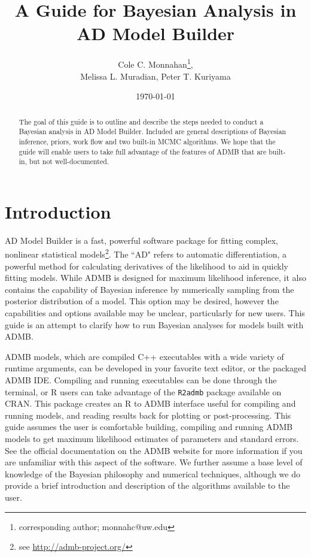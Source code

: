 \documentclass{article}\usepackage[]{graphicx}\usepackage[]{color}
\begin{document}
\title{A Guide for Bayesian Analysis in \\AD Model Builder} \author{Cole
  C. Monnahan\footnote{corresponding author; monnahc@uw.edu},\\ Melissa
  L. Muradian, Peter T. Kuriyama }
\date{\today{}}
\maketitle
\begin{abstract}
  The goal of this guide is to outline and describe the steps needed to
  conduct a Bayesian analysis in AD Model Builder. Included are general
  descriptions of Bayesian inference, priors, work flow and two built-in
  MCMC algorithms. We hope that the guide will enable users to take full
  advantage of the features of ADMB that are built-in, but not
  well-documented.

\end{abstract}

\tableofcontents

\section{Introduction}
AD Model Builder is a fast, powerful software package for fitting
complex, nonlinear statistical
models\cite{fournier2012}\footnote{see
  \url{http://admb-project.org/}}.  The ``AD" refers to
automatic differentiation, a powerful method for calculating
derivatives of the likelihood to aid in quickly fitting
models. While ADMB is designed for maximum likelihood
inference, it also contains the capability of Bayesian
inference by numerically sampling from the posterior
distribution of a model. This option may be desired, however
the capabilities and options available may be unclear,
particularly for new users. This guide is an attempt to
clarify how to run Bayesian analyses for models built with
ADMB.

ADMB models, which are compiled C++ executables with a wide
variety of runtime arguments, can be developed in your
favorite text editor, or the packaged ADMB IDE. Compiling
and running executables can be done through the terminal, or
R users can take advantage of the \texttt{R2admb} package
available on CRAN. This package creates an R to ADMB
interface useful for compiling and running models, and
reading results back for plotting or post-processing. This
guide assumes the user is comfortable building, compiling
and running ADMB models to get maximum likelihood estimates
of parameters and standard errors. See the official
documentation on the ADMB website for more information if
you are unfamiliar with this aspect of the software. We
further assume a base level of knowledge of the Bayesian
philosophy and numerical techniques, although we do provide
a brief introduction and description of the algorithms
available to the user.
\end{document}
